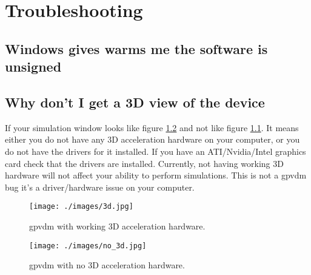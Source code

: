 \chapter{Troubleshooting}
\section{Windows gives warms me the software is unsigned}

\section{Why don't I get a 3D view of the device}

If your simulation window looks like figure \ref{fig:nothreed} and not like figure \ref{fig:threed}.  It means  either you do not have any 3D acceleration hardware on your computer, or you do not have the drivers for it installed.  If you have an ATI/Nvidia/Intel graphics card check that the drivers are installed.  Currently, not having working 3D hardware will not affect your ability to perform simulations. This is not a gpvdm bug it's a driver/hardware issue on your computer.

\begin{figure}[H]
\centering
\texttt{[image: ./images/3d.jpg]}
\caption{gpvdm with working 3D acceleration hardware.}
\label{fig:threed}
\end{figure}

\begin{figure}[H]
\centering
\texttt{[image: ./images/no\_3d.jpg]}
\caption{gpvdm with no 3D acceleration hardware.}
\label{fig:nothreed}
\end{figure}



